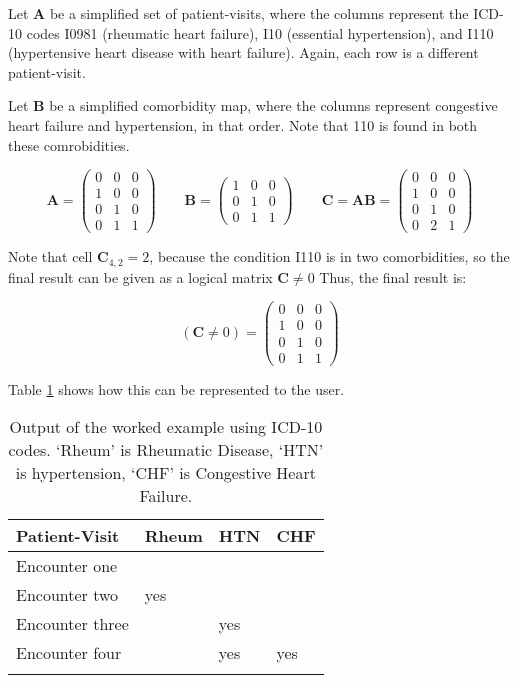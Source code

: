 \documentclass[article]{jss}
\begin{document}
Let \(\boldsymbol{A}\) be a simplified set of patient-visits, where the
columns represent the ICD-10 codes I0981 (rheumatic heart failure), I10
(essential hypertension), and I110 (hypertensive heart disease with
heart failure). Again, each row is a different patient-visit.

Let \(\boldsymbol{B}\) be a simplified comorbidity map, where the
columns represent congestive heart failure and hypertension, in that
order. Note that 110 is found in both these comrobidities.

\[\boldsymbol{A} =
\begin{pmatrix}
0 & 0 & 0 \\
1 & 0 & 0 \\
0 & 1 & 0 \\
0 & 1 & 1
\end{pmatrix}
\qquad
\boldsymbol{B} =
\begin{pmatrix}
1 & 0 & 0 \\
0 & 1 & 0 \\
0 & 1 & 1
\end{pmatrix}
\qquad
\boldsymbol{C} = \boldsymbol{A}\boldsymbol{B} =
\begin{pmatrix}
0 & 0 & 0 \\
1 & 0 & 0 \\
0 & 1 & 0 \\
0 & 2 & 1
\end{pmatrix}\]\label{eq:ABC}

Note that cell \(\boldsymbol{C}_{4,2} = 2\), because the condition I110
is in two comorbidities, so the final result can be given as a logical
matrix \(\boldsymbol{C} \neq 0\) Thus, the final result is:

\[(\boldsymbol{C} \neq 0) =
\begin{pmatrix}
0 & 0 & 0 \\
1 & 0 & 0 \\
0 & 1 & 0 \\
0 & 1 & 1
\end{pmatrix}\]\label{eq:Clogical}

Table \ref{tab:cmbresult} shows how this can be represented to the user.

\begin{longtable}[t]{l|l|l|l}
\hline
Patient-Visit & Rheum & HTN & CHF\\
\hline
Encounter one &  &  & \\
\hline
Encounter two & yes &  & \\
\hline
Encounter three &  & yes & \\
\hline
Encounter four &  & yes & yes\\
\hline
\caption{\label{tab:cmbresult}Output of the worked example using ICD-10 codes. `Rheum' is Rheumatic Disease, `HTN' is hypertension, `CHF' is Congestive Heart Failure.}\\
\end{longtable}
\end{document}
